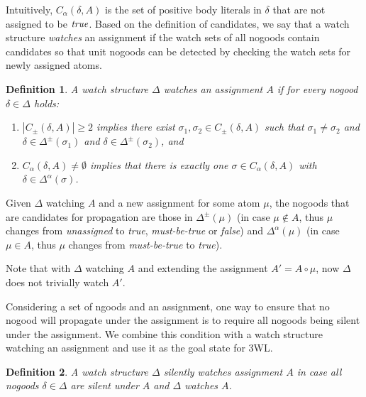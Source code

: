 \documentclass{vutinfth} %
\newtheorem{definition}{Definition}[chapter]
\newcommand{\mbt}{must-be-true\xspace}
\newcommand{\ass}{A}
\newcommand{\cdpm}{C_\pm}
\newcommand{\cdal}{C_\alpha}
\newcommand{\dpm}{\Delta^\pm}
\newcommand{\dal}{\Delta^\alpha}
\newcommand{\lowinv}{watches\xspace}
\newcommand{\sgl}{\mu}
\newcommand{\bsgl}{\sigma}
\begin{document}
Intuitively, $C_\alpha(\delta, A)$ is the set of positive body literals in $\delta$ that are not assigned to be $\emph{true}$. Based on the definition of candidates, we say that a watch structure \emph{watches} an assignment if the watch sets of all nogoods contain candidates so that unit nogoods can be detected by checking the watch sets for newly assigned atoms.

\begin{definition}
A watch structure $\Delta$ \emph{\lowinv} an assignment $\ass$ if for every nogood $\delta \in \Delta$ holds:

\begin{enumerate}
\item $|\cdpm(\delta, A)| \geq 2$ implies there exist $\bsgl_1, \bsgl_2 \in \cdpm(\delta, A)$ such that $\bsgl_1 \not = \bsgl_2$ and $\delta \in \dpm(\bsgl_1)$ and $\delta \in \dpm(\bsgl_2)$, and
\item $\cdal(\delta, A) \not = \emptyset$ implies that there is exactly one $\bsgl \in \cdal(\delta, A)$ with $\delta \in \dal(\bsgl)$.
\end{enumerate}
\end{definition}

Given $\Delta$ watching $\ass$ and a new assignment for some atom $\sgl$, the nogoods that are candidates for propagation are those in $\dpm(\sgl)$ (in case $\sgl \not \in A$, thus $\sgl$ changes from \emph{unassigned} to \emph{true}, \emph{\mbt} or \emph{false}) and $\dal(\sgl)$ (in case $\sgl \in A$, thus $\sgl$ changes from \emph{\mbt} to \emph{true}).

Note that with $\Delta$ watching $\ass$ and extending the assignment $\ass' = \ass \circ \sgl$, now $\Delta$ does not trivially watch $\ass'$.

Considering a set of ngoods and an assignment, one way to ensure that no nogood will propagate under the assignment is to require all nogoods being silent under the assignment. We combine this condition with a watch structure watching an assignment and use it as the goal state for 3WL.

\begin{definition}
A watch structure $\Delta$ \emph{silently watches} assignment $\ass$ in case all nogoods $\delta \in \Delta$ are silent under $\ass$ and $\Delta$ watches $\ass$.
\end{definition}
\end{document}
